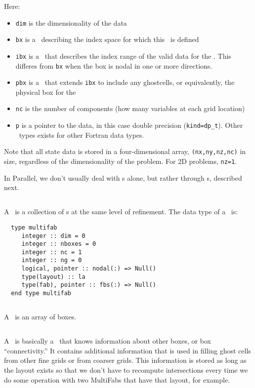 \noindent Here:
\begin{itemize}
\item {\tt dim} is the dimensionality of the data
\item {\tt bx} is a \Boxtype\ describing the index space for which this \FAB\ is defined
\item {\tt ibx} is a \Boxtype\ that describes the index range of the valid data
  for the \FAB.  This differes from {\tt bx} when the box is nodal in one or more 
  directions.
\item {\tt pbx} is a \Boxtype\ that extends {\tt ibx} to include
  any ghostcells, or equivalently, the physical box for the \FAB\
\item {\tt nc} is the number of components (how many variables at  
  each grid location)
\item {\tt p} is a pointer to the data, in this case double precision
  ({\tt kind=dp\_t}).  Other \FAB\ types exists for other Fortran
  data types.
\end{itemize}


Note that all state data is stored in a four-dimensional array,
{\tt (nx,ny,nz,nc)} in size, regardless of the dimensionality of the
problem.  For 2D problems, {\tt nz=1}.

In Parallel, we don't usually deal with \FAB s alone, but rather
through \MultiFab s, described next.

\subsection{\MultiFab}

A \MultiFab\ is a collection of \FAB s at the same level of
refinement.  The data type of a \MultiFab\ is:
\begin{verbatim}
  type multifab
     integer :: dim = 0
     integer :: nboxes = 0
     integer :: nc = 1
     integer :: ng = 0
     logical, pointer :: nodal(:) => Null()
     type(layout) :: la
     type(fab), pointer :: fbs(:) => Null()
  end type multifab
\end{verbatim}

\subsection{\BoxArray}

A \BoxArray\ is an array of boxes.  

\subsection{\layout}

A \layout\ is basically a \BoxArray\ that knows information about other
boxes, or box ``connectivity.''  It contains additional information
that is used in filling ghost cells from other fine grids or from
coarser grids.  This information is stored as long as the layout
exists so that we don't have to recompute intersections every time we
do some operation with two MultiFabs that have that layout, for
example.
